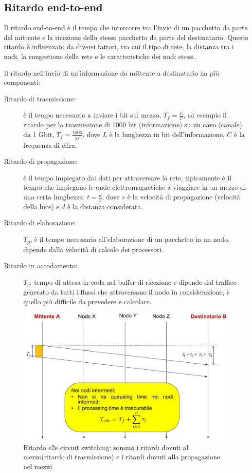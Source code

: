 \subsection{Ritardo end-to-end}
Il ritardo end-to-end è il tempo che intercorre tra l'invio di un pacchetto da parte del mittente e la ricezione dello stesso pacchetto da parte del destinatario. Questo ritardo è influenzato da diversi fattori, tra cui il tipo di rete, la distanza tra i nodi, la congestione della rete e le caratteristiche dei nodi stessi. 

Il ritardo nell'invio di un'informazione da mittente a destinatario ha più componenti:
    \begin{description}
        \item[Ritardo di trasmissione:] è il tempo necessario a inviare i bit sul mezzo, $T_f = \frac{L}{C}$, ad esempio il ritardo per la trasmissione di 1000 bit (informazione) su un cavo (canale) da 1 Gbit, $T_f = \frac{1000}{10^9}$, dove $L$ è la lunghezza in bit dell'informazione, $C$ è la frequenza di cifra.

        \item[Ritardo di propagazione:] è il tempo impiegato dai dati per attraversare la rete, tipicamente è il tempo che impiegano le onde elettromagnetiche a viaggiare in un mezzo di una certa lunghezza: $t = \frac{d}{v}$, dove $v$ è la velocità di propagazione (velocità della luce) e $d$ è la distanza considerata.

        \item[Ritardo di elaborazione:] $T_p$, è il tempo necessario all'elaborazione di un pacchetto in un nodo, dipende dalla velocità di calcolo dei processori.

        \item[Ritardo in accodamento:] $T_q$, tempo di attesa in coda nel buffer di ricezione e dipende dal traffico generato da tutti i flussi che attraversano il nodo in considerazione, è quello più difficile da prevedere e calcolare.
    \end{description}
    \begin{figure}[h!]
        \centering
        \includegraphics[width=1\textwidth]{images/e2e_circuit_switching.png}
        \caption{Ritardo e2e circuit switching: sommo i ritardi dovuti al mezzo(ritardo di trasmissione) e i ritardi dovuti alla propagazione nel mezzo}
        \label{fig:circuit_switching}
    \end{figure}
    
